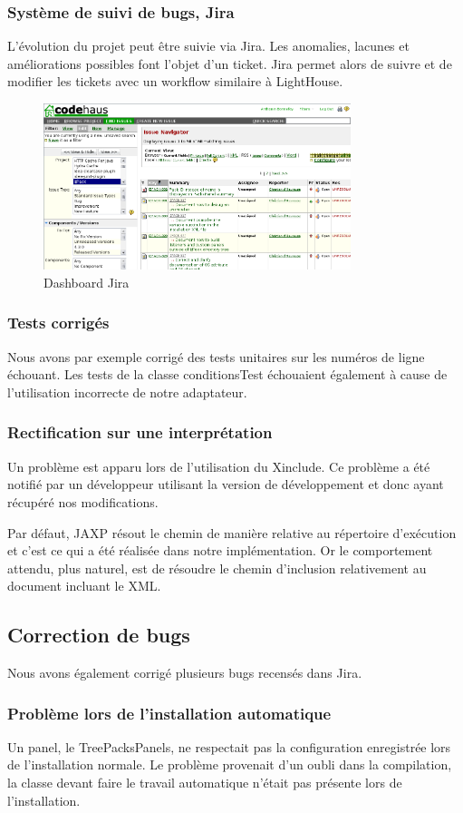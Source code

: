 \subsubsection{Système de suivi de bugs, Jira}
L'évolution du projet peut être suivie via Jira.
Les anomalies, lacunes et améliorations possibles font l'objet d'un ticket.
Jira permet alors de suivre et de modifier les tickets avec un workflow similaire à LightHouse.
\begin{figure}[H]
	\centering
	\includegraphics[width=0.8\textwidth]{../image/jira.png}
	\caption{Dashboard Jira}
\end{figure}
\subsubsection{Tests corrigés}
Nous avons par exemple corrigé des tests unitaires sur les numéros de ligne échouant.
Les tests de la classe conditionsTest échouaient également à cause de l'utilisation incorrecte de notre adaptateur.
\subsubsection{Rectification sur une interprétation}
Un problème est apparu lors de l'utilisation du Xinclude.
Ce problème a été notifié par un développeur utilisant la version de développement et donc ayant récupéré nos modifications.

Par défaut, JAXP résout le chemin de manière relative au répertoire d'exécution et c'est ce qui a été réalisée dans notre implémentation.
Or le comportement attendu, plus naturel, est de résoudre le chemin d'inclusion relativement au document incluant le XML.

\subsection{Correction de bugs}
Nous avons également corrigé plusieurs bugs recensés dans Jira.
\subsubsection{Problème lors de l'installation automatique}
Un panel, le TreePacksPanels, ne respectait pas la configuration enregistrée lors de l'installation normale.
Le problème provenait d'un oubli dans la compilation, la classe devant faire le travail automatique n'était pas présente lors de l'installation.

